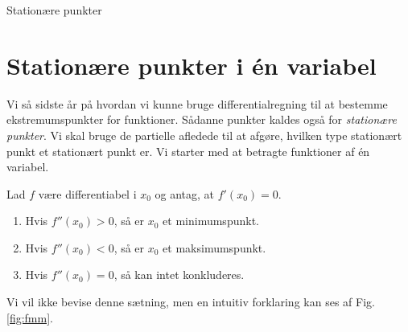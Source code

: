 \begin{center}
\Huge
Stationære punkter
\end{center}

\section*{Stationære punkter i én variabel}

Vi så sidste år på hvordan vi kunne bruge differentialregning til at bestemme ekstremumspunkter for funktioner. Sådanne punkter kaldes også for \textit{stationære punkter}. Vi skal bruge de partielle afledede til at afgøre, hvilken type stationært punkt et stationært punkt er. Vi starter med at betragte funktioner af én variabel.

\begin{setn}
	\label{setn:1}
	Lad $f$ være differentiabel i $x_0$ og antag, at $f'(x_0) = 0$. 
	\begin{enumerate}[label=\roman*)]
		\item Hvis $f''(x_0) >0$, så er $x_0$ et minimumspunkt. 
		\item Hvis $f''(x_0)<0$, så er $x_0$ et maksimumspunkt. 
		\item Hvis $f''(x_0)=0$, så kan intet konkluderes.
	\end{enumerate}
\end{setn}
Vi vil ikke bevise denne sætning, men en intuitiv forklaring kan ses af Fig. \ref{fig:fmm}.
